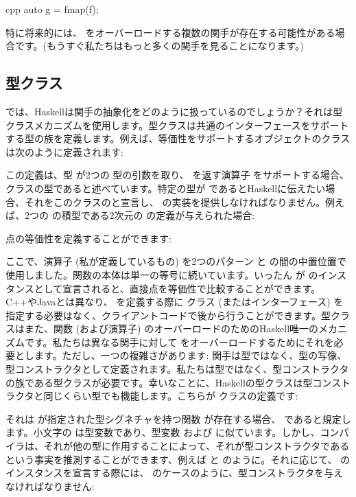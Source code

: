 \begin{snip}{cpp}
auto g = fmap(f);
\end{snip}
特に将来的には、 をオーバーロードする複数の関手が存在する可能性がある場合です。(もうすぐ私たちはもっと多くの関手を見ることになります。) 

\subsection{型クラス}

では、Haskellは関手の抽象化をどのように扱っているのでしょうか？それは型クラスメカニズムを使用します。型クラスは共通のインターフェースをサポートする型の族を定義します。例えば、等価性をサポートするオブジェクトのクラスは次のように定義されます: 

この定義は、型  が2つの  型の引数を取り、 を返す演算子 \code{(==)} をサポートする場合、 クラスの型であると述べています。特定の型が  であるとHaskellに伝えたい場合、それをこのクラスのと宣言し、\code{(==)} の実装を提供しなければなりません。例えば、2つの  の積型である2次元の  の定義が与えられた場合: 

点の等価性を定義することができます: 

ここで、演算子 \code{(==)} (私が定義しているもの) を2つのパターン  と  の間の中置位置で使用しました。関数の本体は単一の等号に続いています。いったん  が  のインスタンスとして宣言されると、直接点を等価性で比較することができます。C++やJavaとは異なり、 を定義する際に  クラス (またはインターフェース) を指定する必要はなく、クライアントコードで後から行うことができます。型クラスはまた、関数 (および演算子) のオーバーロードのためのHaskell唯一のメカニズムです。私たちは異なる関手に対して  をオーバーロードするためにそれを必要とします。ただし、一つの複雑さがあります: 関手は型ではなく、型の写像、型コンストラクタとして定義されます。私たちは型ではなく、型コンストラクタの族である型クラスが必要です。幸いなことに、Haskellの型クラスは型コンストラクタと同じくらい型でも機能します。こちらが  クラスの定義です: 

それは  が指定された型シグネチャを持つ関数  が存在する場合、 であると規定します。小文字の  は型変数であり、型変数  および  に似ています。しかし、コンパイラは、それが他の型に作用することによって、それが型コンストラクタであるという事実を推測することができます、例えば  と  のように。それに応じて、 のインスタンスを宣言する際には、 のケースのように、型コンストラクタを与えなければなりません: 

